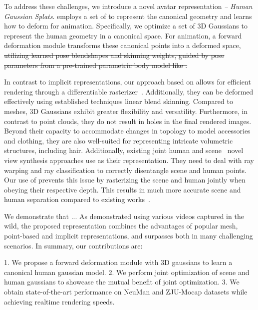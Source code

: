 To address these challenges, we introduce a novel avatar representation \emph{\acronym\;-- Human Gaussian Splats}. \acronym employs a set of \gauss to represent the canonical geometry and learns how to deform \gauss for animation. Specifically, we optimize a set of 3D Gaussians to represent the human geometry in a canonical space. For animation, a forward deformation module transforms these canonical points into a deformed space, \st{utilizing learned pose blendshapes and skinning weights, guided by pose parameters from a pre-trained parametric body model like \smpl.}



In contrast to implicit representations, our approach based on \gauss allows for efficient rendering through a differentiable rasterizer~\cite{kerbl3Dgaussians}. Additionally, they can be deformed effectively using established techniques \eg linear blend skinning. Compared to meshes, 3D Gaussians exhibit greater flexibility and versatility. Furthermore, in contrast to point clouds, they do not result in holes in the final rendered images.  
%
Beyond their capacity to accommodate changes in topology to model accessories and clothing, they are also well-suited for representing intricate volumetric structures, including hair. Additionally, existing joint human and scene~\cite{jiang2022neuman, guo2023vid2avatar} novel view synthesis approaches use \nerf as their representation. They need to deal with ray warping and ray classification to correctly disentangle scene and human points. Our use of \gauss prevents this issue by rasterizing the scene and human \gauss jointly when obeying their respective depth. This results in much more accurate scene and human separation compared to existing works~\cite{jiang2022neuman,guo2023vid2avatar}.

We demonstrate that ... 
As demonstrated using various videos captured in the wild, the proposed representation combines the advantages of popular mesh, point-based and implicit representations, and surpasses both in many challenging scenarios. In summary, our contributions are:


   1. We propose a forward deformation module with 3D gaussians to learn a canonical human gaussian model.
   2. We perform joint optimization of scene and human gaussians to showcase the mutual benefit of joint optimization.
   3. We obtain state-of-the-art performance on NeuMan and ZJU-Mocap datasets while achieving realtime rendering speeds.


